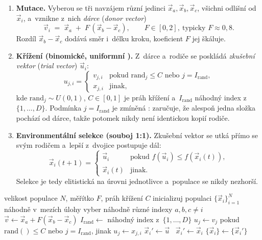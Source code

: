 \documentclass[11pt,a4paper]{article}
\theoremstyle{definition}
\begin{document}
\begin{enumerate}
\item \textbf{Mutace.} Vyberou se tři navzájem různí jedinci
  $\vec x_{a}, \vec x_{b}, \vec x_{c}$, všichni odlišní od $\vec x_i$, a~vznikne z~nich
  \emph{dárce} (\emph{donor vector})
  \[
  \vec v_i \;=\; \vec x_{a} \;+\; F\,(\vec x_{b} - \vec x_{c}),
  \qquad F \in [0,2],\ \text{typicky } F \approx 0{,}8 .
  \]
  Rozdíl $\vec x_{b} - \vec x_{c}$ dodává směr i~délku kroku, koeficient $F$ jej škáluje.
\item \textbf{Křížení (binomické, uniformní ).}
  Z~dárce a~rodiče se poskládá \emph{zkušební vektor} (\emph{trial vector}) $\vec u_i$:
  \[
  u_{j,i} =
  \begin{cases}
  v_{j,i} & \text{pokud } \mathrm{rand}_j \le C \text{ nebo } j = I_{\mathrm{rand}},\\[2pt]
  x_{j,i} & \text{jinak},
  \end{cases}
  \]
  kde $\mathrm{rand}_j \sim U(0,1)$, $C \in [0,1]$ je práh křížení a~$I_{\mathrm{rand}}$
  náhodný index z~$\{1,\dots,D\}$. Podmínka $j = I_{\mathrm{rand}}$ je zmíněná
  : zaručuje, že alespoň jedna složka pochází od dárce, takže potomek nikdy
  není identickou kopií rodiče.
\item \textbf{Environmentální selekce (souboj 1:1).} Zkušební vektor se utká přímo se svým
  rodičem a~lepší z~dvojice postupuje dál:
  \[
  \vec x_i(t+1) =
  \begin{cases}
  \vec u_i & \text{pokud } f(\vec u_i) \le f(\vec x_i(t)),\\
  \vec x_i(t) & \text{jinak.}
  \end{cases}
  \]
  Selekce je tedy elitistická na úrovni jednotlivce a~populace se nikdy nezhorší.
\end{enumerate}

\begin{algorithm}[!ht]
\caption{DE/rand/1/bin}
\begin{algorithmic}[1]
\Require velikost populace $N$, měřítko $F$, práh křížení $C$
\State inicializuj populaci $\{\vec x_i\}_{i=1}^{N}$ náhodně v~mezích úlohy
    \State vyber náhodně různé indexy $a,b,c \ne i$
    \State $\vec v \gets \vec x_a + F(\vec x_b - \vec x_c)$
    \State $I_{\mathrm{rand}} \gets$ náhodný index z~$\{1,\dots,D\}$
      \State $u_j \gets v_j$ pokud $\mathrm{rand}() \le C$ nebo $j = I_{\mathrm{rand}}$, jinak $u_j \gets x_{j,i}$
    \EndFor
     $\vec x_i' \gets \vec u$ \Else\ $\vec x_i' \gets \vec x_i$ \EndIf
  \EndFor
  \State $\{\vec x_i\} \gets \{\vec x_i'\}$
\EndWhile
\end{algorithmic}
\end{algorithm}
\end{document}
